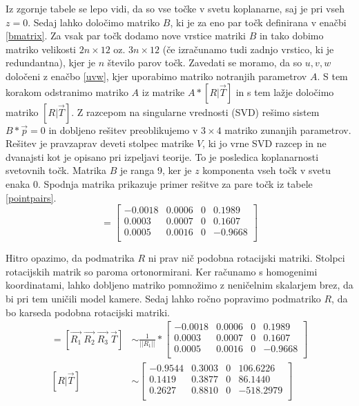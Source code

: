 \documentclass[a4paper, 12pt]{book}
\begin{document}
Iz zgornje tabele se lepo vidi, da so vse točke v svetu koplanarne, saj je pri vseh $z = 0$. Sedaj lahko določimo matriko $B$, ki je za eno par točk definirana v enačbi \eqref{bmatrix}. Za vsak par točk dodamo nove vrstice matriki $B$ in tako dobimo matriko velikosti $2n \times 12$ oz. $3n \times 12$ (če izračunamo tudi zadnjo vrstico, ki je redundantna), kjer je $n$ število parov točk. Zavedati se moramo, da so $u, v, w$ določeni z enačbo \eqref{uvw}, kjer uporabimo matriko notranjih parametrov $A$. S tem korakom odstranimo matriko $A$ iz matrike $A * [R|\vec{T}]$ in s tem lažje določimo matriko $[R|\vec{T}]$. Z razcepom na singularne vrednosti (SVD) rešimo sistem $B * \vec{p} = 0$ in dobljeno rešitev preoblikujemo v $3 \times 4$ matriko zunanjih parametrov. Rešitev je pravzaprav deveti stolpec matrike $V$, ki jo vrne SVD razcep in ne dvanajsti kot je opisano pri izpeljavi teorije. To je posledica koplanarnosti svetovnih točk. Matrika $B$ je ranga 9, ker je $z$ komponenta vseh točk v svetu enaka 0. Spodnja matrika prikazuje primer rešitve za pare točk iz tabele \ref{pointpairs}.
\begin{equation}
[R|\vec{T}] = 
\begin{bmatrix}
-0.0018 & 0.0006 & 0 & 0.1989 \\
0.0003 & 0.0007 & 0 & 0.1607 \\
0.0005 & 0.0016  & 0 & -0.9668 \\
\end{bmatrix}
\end{equation}

Hitro opazimo, da podmatrika $R$ ni prav nič podobna rotacijski matriki. Stolpci rotacijskih matrik so paroma ortonormirani. Ker računamo s homogenimi koordinatami, lahko dobljeno matriko pomnožimo z neničelnim skalarjem brez, da bi pri tem uničili model kamere. Sedaj lahko ročno popravimo podmatriko $R$, da bo karseda podobna rotacijski matriki.
\begin{align}
[R|\vec{T}] = [\vec{R_1} \ \vec{R_2} \ \vec{R_3} \ \vec{T}] &\sim \frac{1}{||R_1||} * 
\begin{bmatrix}
-0.0018 & 0.0006 & 0 & 0.1989 \\
0.0003 & 0.0007 & 0 & 0.1607 \\
0.0005 & 0.0016  & 0 & -0.9668 \\
\end{bmatrix} \\
[R|\vec{T}] &\sim
\begin{bmatrix}
-0.9544 & 0.3003 & 0 & 106.6226 \\
0.1419 & 0.3877 & 0 & 86.1440 \\
0.2627 & 0.8810 & 0 & -518.2979 \\
\end{bmatrix}
\end{align}
\end{document}
